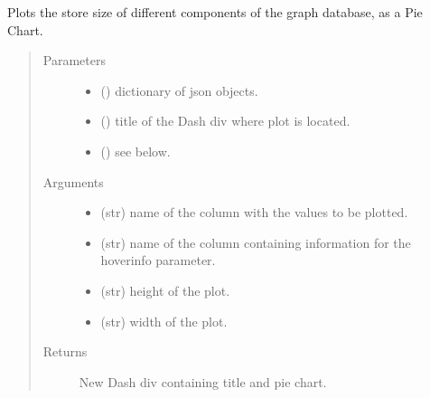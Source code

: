 \documentclass[letterpaper,10pt,english]{sphinxmanual}
\begin{document}

\begin{fulllineitems}
\label{\detokenize{_autosummary/report_manager.apps:report_manager.apps.homepageStats.plot_store_size_components}}
Plots the store size of different components of the graph database, as a Pie Chart.
\begin{quote}\begin{description}
\item[{Parameters}] \leavevmode\begin{itemize}
\item {} 
 () \textendash{} dictionary of json objects.

\item {} 
 () \textendash{} title of the Dash div where plot is located.

\item {} 
 () \textendash{} see below.

\end{itemize}

\item[{Arguments}] \leavevmode\begin{itemize}
\item {} 
 (str) \textendash{} name of the column with the values to be plotted.

\item {} 
 (str) \textendash{} name of the column containing information for the hoverinfo parameter.

\item {} 
 (str) \textendash{} height of the plot.

\item {} 
 (str) \textendash{} width of the plot.

\end{itemize}

\item[{Returns}] \leavevmode
New Dash div containing title and pie chart.

\end{description}\end{quote}

\end{fulllineitems}
\end{document}
